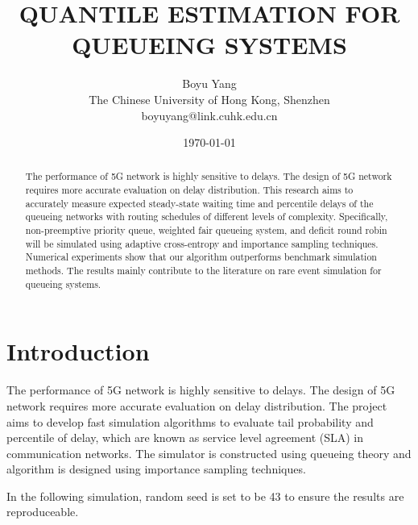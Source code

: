\documentclass{article}
\title{QUANTILE ESTIMATION FOR QUEUEING SYSTEMS}
\date{\today}	%
\author{Boyu Yang\\The Chinese University of Hong Kong, Shenzhen\\boyuyang@link.cuhk.edu.cn}
\begin{document}
\maketitle

\begin{abstract}
	The performance of 5G network is highly sensitive to delays. The design of 5G network requires more accurate evaluation on delay distribution. This research aims to accurately measure expected steady-state waiting time and percentile delays of the queueing networks with routing schedules of different levels of complexity. Specifically, non-preemptive priority queue, weighted fair queueing system, and deficit round robin 
	will be simulated using adaptive cross-entropy and importance sampling techniques. Numerical experiments show that our algorithm outperforms benchmark simulation methods. The results mainly contribute to the literature on rare event simulation for queueing systems.
\end{abstract}




\section{Introduction}
The performance of 5G network is highly sensitive to delays. The design of 5G network requires more accurate evaluation on delay distribution. The project aims to develop fast simulation algorithms to evaluate tail probability and percentile of delay, which are known as service level agreement (SLA) in communication networks. 
	The simulator is constructed using queueing theory and algorithm is designed using importance sampling techniques.

In the following simulation, random seed is set to be 43 to ensure the results are reproduceable.
\end{document}
